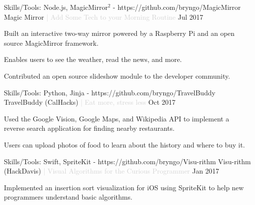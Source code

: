 

\begin{cventries}

  \cventry
  {Skills/Tools: Node.js, MagicMirror$^2$ - https://github.com/bryngo/MagicMirror} %
  {Magic Mirror \textcolor{lightgray}{| Add Some Tech to your Morning Routine}} %
  {} %
  {Jul 2017} %
  {
  \begin{cvitems} %
    \item {Built an interactive two-way mirror powered by a Raspberry Pi and an open source MagicMirror framework.}
    \item {Enables users to see the weather, read the news, and more.}
    \item {Contributed an open source slideshow module to the developer community.}
  \end{cvitems}
  }

  \cventry
  {Skills/Tools: Python, Jinja - https://github.com/bryngo/TravelBuddy} %
  {TravelBuddy (CalHacks) \textcolor{lightgray}{| Eat more, stress less}} %
  {} %
  {Oct 2017} %
  {
  \begin{cvitems} %
    \item {Used the Google Vision, Google Maps, and Wikipedia API to implement a reverse search application for finding nearby restaurants.}
    \item {Users can upload photos of food to learn about the history and where to buy it.}
  \end{cvitems}
  }

  \cventry
  {Skills/Tools: Swift, SpriteKit - https://github.com/bryngo/Visu-rithm} %
  {Visu-rithm (HackDavis) \textcolor{lightgray}{| Visual Algorithms for the Curious Programmer}} %
  {} %
  {Jan 2017} %
  {
  \begin{cvitems} %
    \item {Implemented an insertion sort visualization for iOS using SpriteKit to help new programmers understand basic algorithms.}
  \end{cvitems}
  }

\end{cventries}
